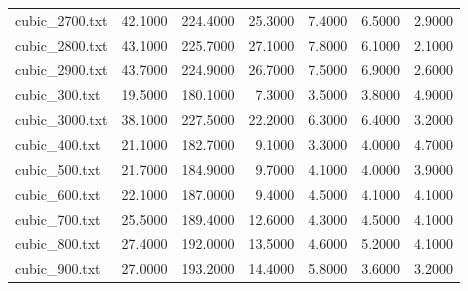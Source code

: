 \begin{table}[h!]
\begin{tabular}{lrrrrrr}
cubic_2700.txt & 42.1000 & 224.4000 & 25.3000 & 7.4000 & 6.5000 & 2.9000 \\
cubic_2800.txt & 43.1000 & 225.7000 & 27.1000 & 7.8000 & 6.1000 & 2.1000 \\
cubic_2900.txt & 43.7000 & 224.9000 & 26.7000 & 7.5000 & 6.9000 & 2.6000 \\
cubic_300.txt & 19.5000 & 180.1000 & 7.3000 & 3.5000 & 3.8000 & 4.9000 \\
cubic_3000.txt & 38.1000 & 227.5000 & 22.2000 & 6.3000 & 6.4000 & 3.2000 \\
cubic_400.txt & 21.1000 & 182.7000 & 9.1000 & 3.3000 & 4.0000 & 4.7000 \\
cubic_500.txt & 21.7000 & 184.9000 & 9.7000 & 4.1000 & 4.0000 & 3.9000 \\
cubic_600.txt & 22.1000 & 187.0000 & 9.4000 & 4.5000 & 4.1000 & 4.1000 \\
cubic_700.txt & 25.5000 & 189.4000 & 12.6000 & 4.3000 & 4.5000 & 4.1000 \\
cubic_800.txt & 27.4000 & 192.0000 & 13.5000 & 4.6000 & 5.2000 & 4.1000 \\
cubic_900.txt & 27.0000 & 193.2000 & 14.4000 & 5.8000 & 3.6000 & 3.2000 \\
\hline
\end{tabular}
\end{table}
